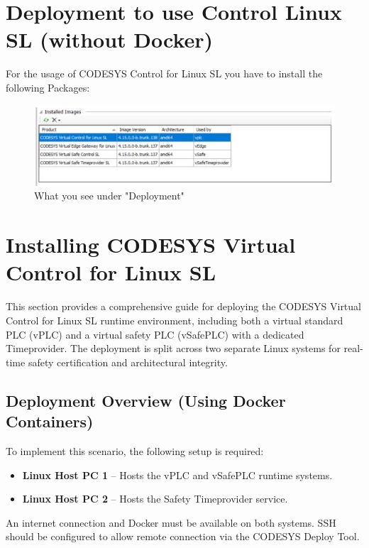 \documentclass[a4paper,12pt]{article}
\begin{document}
\section{Deployment to use Control Linux SL (without Docker)}

For the usage of CODESYS Control for Linux SL you have to install the following Packages:

\begin{figure}[H]
	\centering
	\includegraphics[width=1\textwidth]{4.jpg}
	\caption{What you see under "Deployment"}
\end{figure}
\newpage


\section{Installing CODESYS Virtual Control for Linux SL}

This section provides a comprehensive guide for deploying the CODESYS Virtual Control for Linux SL runtime environment, including both a virtual standard PLC (vPLC) and a virtual safety PLC (vSafePLC) with a dedicated Timeprovider. The deployment is split across two separate Linux systems for real-time safety certification and architectural integrity.

\subsection{Deployment Overview (Using Docker Containers)}

To implement this scenario, the following setup is required:

\begin{itemize}
	\item \textbf{Linux Host PC 1} – Hosts the vPLC and vSafePLC runtime systems.
	\item \textbf{Linux Host PC 2} – Hosts the Safety Timeprovider service.
\end{itemize}

An internet connection and Docker must be available on both systems. SSH should be configured to allow remote connection via the CODESYS Deploy Tool.
\end{document}
